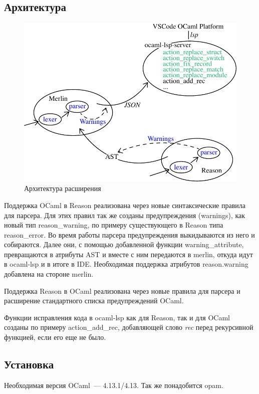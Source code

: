 \subsection{Архитектура}
\begin{figure}[h]
	\includegraphics[width=\linewidth]{graph.pdf}
\caption{Архитектура расширения}
\end{figure}
Поддержка OCaml в Reason реализована через новые синтаксические правила для парсера. Для этих правил так же созданы предупреждения (warnings), как новый тип reason\_warning, по примеру существующего в Reason типа reason\_error. Во время работы парсера предупреждения выкидываются из него и собираются. Далее они, с помощью добавленной функции warning\_attribute, превращаются в атрибуты AST и вместе с ним передаются в merlin, откуда идут в ocaml-lsp и в итоге в IDE. Необходимая поддержка атрибутов reason.warning добавлена на стороне merlin.

Поддержка Reason в OCaml реализована через новые правила для парсера и расширение стандартного списка предупреждений OCaml.

Функции исправления кода в ocaml-lsp как для Reason, так и для OCaml созданы по примеру action\_add\_rec, добавляющей слово {\it rec} перед рекурсивной функцией, если его еще не было.

\subsection{Установка}
Необходимая версия OCaml~--- 4.13.1/4.13. Так же понадобится opam.
 
